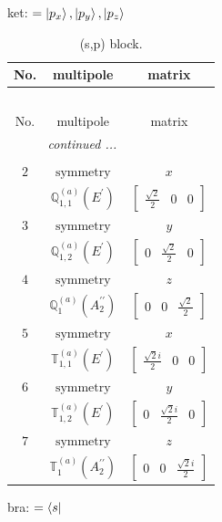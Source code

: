 \documentclass[fleqn,8pt,landscape]{jsarticle}
\begin{document}
\noindent
ket: $=\ket{p_{x}}, \ket{p_{y}}, \ket{p_{z}}$
\renewcommand{\arraystretch}{1.6}
\begin{longtable}{ccc}
\caption{(s,p) block.}
 \\
 \hline \hline
No. & multipole & matrix \\ \hline \endfirsthead

\multicolumn{2}{l}{\tablename\ \thetable{}} \\
 \hline \hline
No. & multipole & matrix \\ \hline \endhead

 \hline \hline
\multicolumn{2}{r}{\footnotesize\it continued ...} \\ \endfoot

 \hline \hline
\multicolumn{2}{r}{} \\ \endlastfoot

$ 2 $ & $ \text{symmetry} $ & $ x $ \\
$  $ & $ \mathbb{Q}_{1,1}^{(a)}(E^{\prime}) $ & $ \begin{bmatrix} \frac{\sqrt{2}}{2} & 0 & 0 \end{bmatrix} $ \\ \hline
$ 3 $ & $ \text{symmetry} $ & $ y $ \\
$  $ & $ \mathbb{Q}_{1,2}^{(a)}(E^{\prime}) $ & $ \begin{bmatrix} 0 & \frac{\sqrt{2}}{2} & 0 \end{bmatrix} $ \\ \hline
$ 4 $ & $ \text{symmetry} $ & $ z $ \\
$  $ & $ \mathbb{Q}_{1}^{(a)}(A_{2}^{\prime\prime}) $ & $ \begin{bmatrix} 0 & 0 & \frac{\sqrt{2}}{2} \end{bmatrix} $ \\ \hline
$ 5 $ & $ \text{symmetry} $ & $ x $ \\
$  $ & $ \mathbb{T}_{1,1}^{(a)}(E^{\prime}) $ & $ \begin{bmatrix} \frac{\sqrt{2} i}{2} & 0 & 0 \end{bmatrix} $ \\ \hline
$ 6 $ & $ \text{symmetry} $ & $ y $ \\
$  $ & $ \mathbb{T}_{1,2}^{(a)}(E^{\prime}) $ & $ \begin{bmatrix} 0 & \frac{\sqrt{2} i}{2} & 0 \end{bmatrix} $ \\ \hline
$ 7 $ & $ \text{symmetry} $ & $ z $ \\
$  $ & $ \mathbb{T}_{1}^{(a)}(A_{2}^{\prime\prime}) $ & $ \begin{bmatrix} 0 & 0 & \frac{\sqrt{2} i}{2} \end{bmatrix} $ \\ \hline
\end{longtable}
bra: $=\bra{s}$
\end{document}
